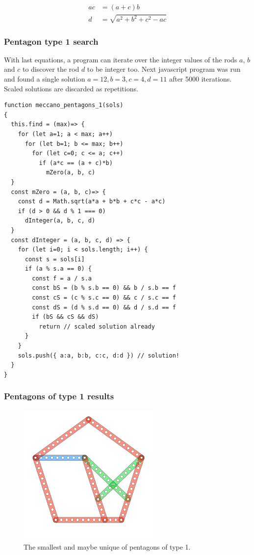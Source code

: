 \documentclass[11pt]{article}
\begin{document}
\begin{align*}
ac &= (a + c)b \\
d &= \sqrt{ a^2 + b^2 + c^2 - ac }
\end{align*}

\subsubsection{Pentagon type 1 search}

With last equations, a program can iterate over the integer values of the rods $a$, $b$ and $c$ to discover the rod $d$ to be integer too. Next javascript program was run and found a single solution $a = 12, b = 3, c = 4, d = 11$ after 5000 iterations. Scaled solutions are discarded as repetitions.

\begin{lstlisting}
function meccano_pentagons_1(sols)
{
  this.find = (max)=> {
    for (let a=1; a < max; a++)
      for (let b=1; b <= max; b++)
        for (let c=0; c <= a; c++)
          if (a*c == (a + c)*b)
            mZero(a, b, c)
  }
  const mZero = (a, b, c)=> {
    const d = Math.sqrt(a*a + b*b + c*c - a*c)
    if (d > 0 && d % 1 === 0)
      dInteger(a, b, c, d)
  }
  const dInteger = (a, b, c, d) => {
    for (let i=0; i < sols.length; i++) {
      const s = sols[i]
      if (a % s.a == 0) {
        const f = a / s.a
        const bS = (b % s.b == 0) && b / s.b == f
        const cS = (c % s.c == 0) && c / s.c == f
        const dS = (d % s.d == 0) && d / s.d == f
        if (bS && cS && dS)
          return // scaled solution already
      }
    }
    sols.push({ a:a, b:b, c:c, d:d }) // solution!
  }
}

\end{lstlisting}

\subsubsection{Pentagons of type 1 results}

\begin{figure}
\centering
\includegraphics[width=7cm]{figs/pentagon-12a}
\caption{The smallest and maybe unique of pentagons of type 1.}
\label{pentagon-12a}
\end{figure}
\end{document}
